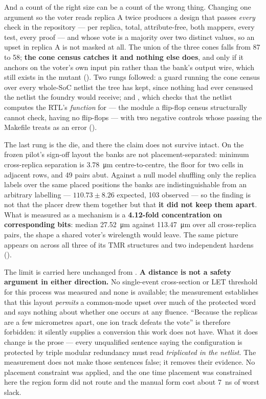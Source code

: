And a count of the right size can be a count of the wrong thing.
Changing one argument so the voter reads replica A twice produces a
design that passes \emph{every} check in the repository --- per replica,
total, attribute-free, both mappers, every test, every proof --- and
whose vote is a majority over two distinct values, so an upset in
replica A is not masked at all. The union of the three cones falls from
87 to 58; \textbf{the cone census catches it and nothing else does}, and only if
it anchors on the voter's own input pin rather than the bank's output
wire, which still exists in the mutant (). Two
rungs followed: a guard running the cone census over every whole-SoC
netlist the tree has kept, since nothing had ever censused the netlist
the foundry would receive; and , which checks that the
netlist computes the RTL's \emph{function} for  --- the
module a flip-flop census structurally cannot check, having no
flip-flops --- with two negative controls whose passing the Makefile
treats as an error ().

The last rung is the die, and there the claim does not survive intact.
On the frozen pilot's sign-off layout the banks are not
placement-separated: minimum cross-replica separation is
\SI{3.78}{\micro\meter} centre-to-centre, the floor for two cells in
adjacent rows, and 49 pairs abut. Against a null model shuffling only
the replica labels over the same placed positions the banks are
indistinguishable from an arbitrary labelling --- $110.73 \pm 8.26$
expected, 103 observed --- so the finding is not that the placer drew
them together but that \textbf{it did not keep them apart}. What is
measured as a mechanism is a \textbf{4.12-fold concentration on
corresponding bits}: median \SI{27.52}{\micro\meter} against
\SI{113.47}{\micro\meter} over all cross-replica pairs, the shape a
shared voter's wirelength would leave. The same picture appears on
 across all three of its TMR structures and two
independent hardens ().

The limit is carried here unchanged from .
\textbf{A distance is not a safety argument in either direction.} No
single-event cross-section or LET threshold for this process was
measured and none is available; the measurement establishes that this
layout \emph{permits} a common-mode upset over much of the protected
word and says nothing about whether one occurs at any fluence.
``Because the replicas are a few micrometres apart, one ion track
defeats the vote'' is therefore forbidden: it silently supplies a
conversion this work does not have. What it does change is the prose ---
every unqualified sentence saying the configuration is protected by
triple modular redundancy must read \emph{triplicated in the netlist}.
The measurement does not make those sentences false; it removes their
evidence. No placement constraint was applied, and the one time
placement was constrained here the region form did not route and the
manual form cost about \SI{7}{\nano\second} of worst slack.

